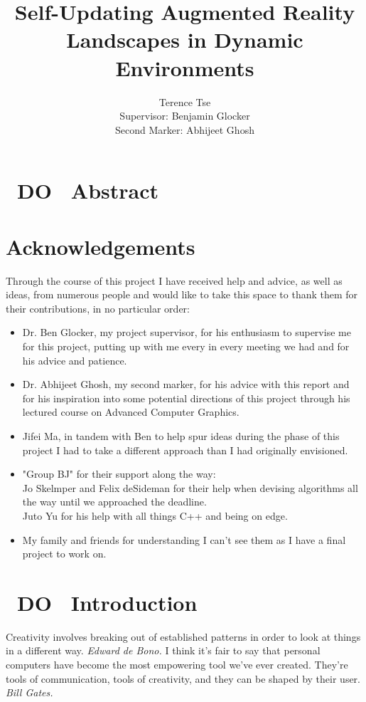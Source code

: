 \documentclass[11pt]{article}
\begin{document}
\title{Self-Updating Augmented Reality Landscapes in Dynamic Environments}
\author{Terence Tse \\
		Supervisor: Benjamin Glocker\\
		Second Marker: Abhijeet Ghosh}
\maketitle

\newpage
\section*{~DO~ Abstract}
\newpage
\section*{Acknowledgements}
Through the course of this project I have received help and advice, as
well as ideas, from numerous people and would like to take this space
to thank them for their contributions, in no particular order:
\begin{itemize}
	\item Dr. Ben Glocker, my project supervisor, for his enthusiasm
		  to supervise me for this project, putting up with me every 
		  in every meeting we had and for his advice and patience.
	\item Dr. Abhijeet Ghosh, my second marker, for his advice with
		  this report and for his inspiration into some potential
		  directions of this project through his lectured course on
		  Advanced Computer Graphics.
	\item Jifei Ma, in tandem with Ben to help spur ideas during the
		  phase of this project I had to take a different approach than
		  I had originally envisioned.
	\item "Group BJ" for their support along the way: \\
		  Jo Skelmper and Felix deSideman for their help when devising
		  algorithms all the way until we approached the deadline.\\
		  Juto Yu for his help with all things C++ and being on edge.
	\item My family and friends for understanding I can't see them as I
		  have a final project to work on.
\end{itemize}

\newpage
\tableofcontents
\newpage

\section{~DO~ Introduction}
\begin{center}
Creativity involves breaking out of established patterns in
		order to look at things in a different way. \textit{Edward de Bono.}
I think it's fair to say that personal computers have become
		the most empowering tool we've ever created. They're tools of
		communication, tools of creativity, and they can be shaped by
		their user. \textit{Bill Gates.}		
\end{center}
\end{document}
